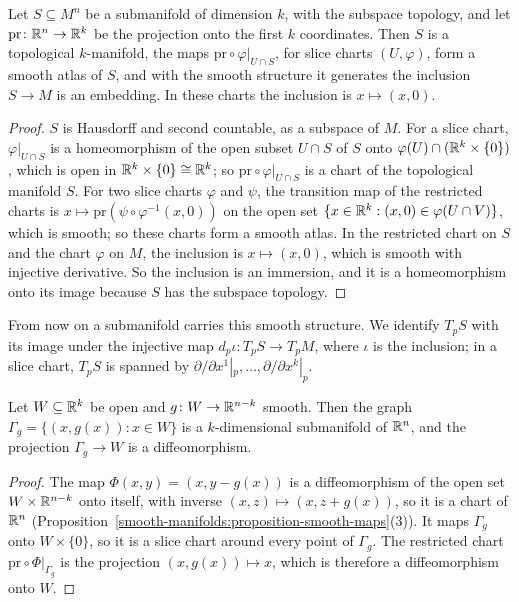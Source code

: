 \begin{lemma}\label{smooth-manifolds:lemma-submanifold-structure}
Let $S \subseteq M^n$ be a submanifold of dimension $k$, with the subspace topology, and let $\mathrm{pr} \colon \mathbb{R}^n \to \mathbb{R}^k$ be the projection onto the
first $k$ coordinates. Then $S$ is a topological $k$-manifold, the maps $\mathrm{pr} \circ \varphi|_{U \cap S}$, for slice charts $(U, \varphi)$, form a smooth
atlas of $S$, and with the smooth structure it generates the inclusion $S \to M$ is an embedding. In these charts the inclusion is $x \mapsto (x, 0)$.
\end{lemma}

\begin{proof}
$S$ is Hausdorff and second countable, as a subspace of $M$. For a slice chart, $\varphi|_{U \cap S}$ is a homeomorphism of the open subset $U \cap S$ of $S$
onto $\varphi(U) \cap (\mathbb{R}^k \times \{0\})$, which is open in $\mathbb{R}^k \times \{0\} \cong \mathbb{R}^k$; so $\mathrm{pr} \circ \varphi|_{U \cap S}$ is a chart of the
topological manifold $S$. For two slice charts $\varphi$ and $\psi$, the transition map of the restricted charts is $x \mapsto \mathrm{pr}(\psi \circ
\varphi^{-1}(x, 0))$ on the open set $\{x \in \mathbb{R}^k : (x, 0) \in \varphi(U \cap V)\}$, which is smooth; so these charts form a smooth atlas. In the restricted
chart on $S$ and the chart $\varphi$ on $M$, the inclusion is $x \mapsto (x, 0)$, which is smooth with injective derivative. So the inclusion is an immersion,
and it is a homeomorphism onto its image because $S$ has the subspace topology.
\end{proof}

From now on a submanifold carries this smooth structure. We identify $T_pS$ with its image under the injective map $d_p\iota \colon T_pS \to T_pM$, where
$\iota$ is the inclusion; in a slice chart, $T_pS$ is spanned by $\partial/\partial x^1|_p, \ldots, \partial/\partial x^k|_p$.

\begin{proposition}\label{smooth-manifolds:proposition-graph-submanifold}
Let $W \subseteq \mathbb{R}^k$ be open and $g \colon W \to \mathbb{R}^{n-k}$ smooth. Then the graph $\Gamma_g = \{(x, g(x)) : x \in W\}$ is a $k$-dimensional submanifold of
$\mathbb{R}^n$, and the projection $\Gamma_g \to W$ is a diffeomorphism.
\end{proposition}

\begin{proof}
The map $\Phi(x, y) = (x, y - g(x))$ is a diffeomorphism of the open set $W \times \mathbb{R}^{n-k}$ onto itself, with inverse $(x, z) \mapsto (x, z + g(x))$, so it is a
chart of $\mathbb{R}^n$ (Proposition~\ref{smooth-manifolds:proposition-smooth-maps}(3)). It maps $\Gamma_g$ onto $W \times \{0\}$, so it is a slice chart around every
point of $\Gamma_g$. The restricted chart $\mathrm{pr} \circ \Phi|_{\Gamma_g}$ is the projection $(x, g(x)) \mapsto x$, which is therefore a diffeomorphism onto $W$.
\end{proof}

